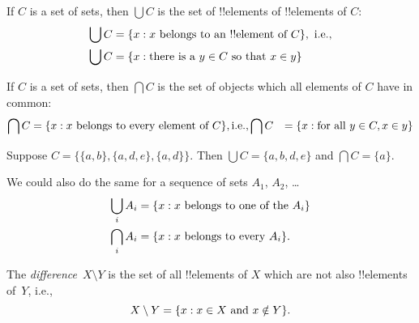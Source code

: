 \documentclass[../../../include/open-logic-section]{subfiles}
\begin{document}
\begin{defn}
If $C$ is a set of sets, then $\bigcup C$ is the set of !!{element}s of
!!{element}s of $C$:
\begin{align*}
\bigcup C & = \Setabs{x}{x \text{ belongs to an !!{element} of } C},
\text{ i.e.,}\\
\bigcup C & = \Setabs{x}{\text{there is a } y \in C
  \text{ so that } x \in y}
\end{align*}
\end{defn}

\begin{defn}
If $C$ is a set of sets, then $\bigcap C$ is the set of objects which
all elements of $C$ have in common:
\begin{align*}
\bigcap C & = \Setabs{x}{x \text{ belongs to every element of } C}, \text{i.e.,}
\bigcap C & = \Setabs{x}{\text{for all } y \in C, x \in y}
\end{align*}
\end{defn}

\begin{ex}
Suppose $C = \{ \{ a, b \}, \{ a, d, e \}, \{ a, d \} \}$.
Then $\bigcup C = \{ a, b, d, e \}$ and $\bigcap C = \{ a \}$.
\end{ex}

We could also do the same for a sequence of sets $A_1$, $A_2$, \dots
\begin{align*}
\bigcup_i A_i & = \Setabs{x}{x \text{ belongs to one of the } A_i}\\
\bigcap_i A_i & = \Setabs{x}{x \text{ belongs to every } A_i}.
\end{align*}

\begin{defn}
The \emph{difference}~$X \setminus Y$ is the set of all !!{element}s of
$X$ which are not also !!{element}s of~$Y$, i.e.,
\[
X\setminus Y = \{ x : x\in X \text{ and } x \notin Y \}.
\]
\end{defn}
\end{document}
